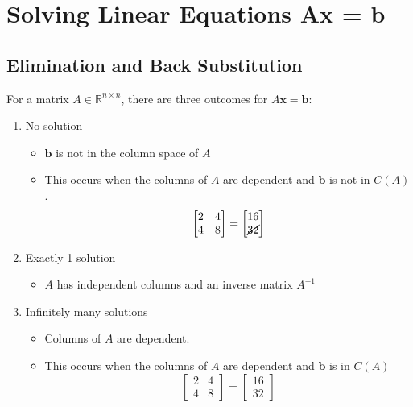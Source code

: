 \documentclass[11pt]{article}
\begin{document}
\section{Solving Linear Equations Ax = b}

\subsection{Elimination and Back Substitution}

For a matrix $A \in \mathbb{R}^{n \times n}$, there are three outcomes for 
$A\boldsymbol{x} = \boldsymbol{b}$:

\begin{enumerate}
    \item No solution
    \begin{itemize}
        \item $\boldsymbol{b}$ is not in the column space of $A$
        \item This occurs when the columns of $A$ are dependent and $\boldsymbol{b}$ is not in
        $C(A)$.
        \[\begin{bmatrix}
            2 & 4\\
            4 & 8
            \end{bmatrix} = \begin{bmatrix}
                16 \\
                \cancel{32}
                \end{bmatrix} \]
    \end{itemize}
    \item Exactly 1 solution
    \begin{itemize}
        \item $A$ has independent columns and an inverse matrix $A^{-1}$
    \end{itemize}
    \item Infinitely many solutions
    \begin{itemize}
        \item Columns of $A$ are dependent.
        \item This occurs when the columns of $A$ are dependent and $\boldsymbol{b}$ is in 
        $C(A)$
        \[\begin{bmatrix}
            2 & 4\\
            4 & 8
            \end{bmatrix} = \begin{bmatrix}
                16 \\
                32
                \end{bmatrix} \]
    \end{itemize}
\end{enumerate}
\end{document}
